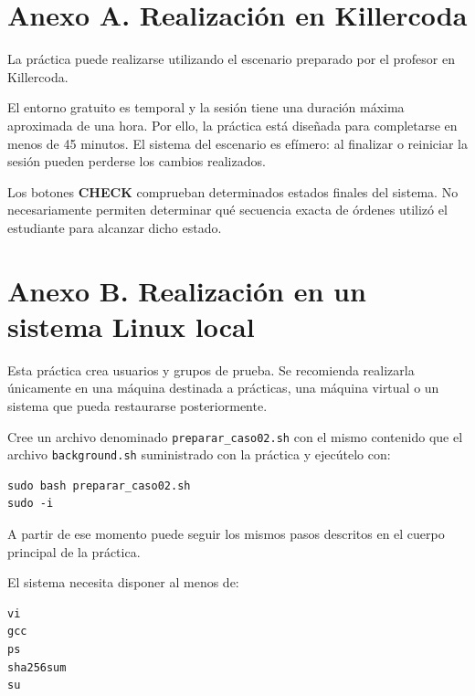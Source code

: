 \appendix

\section*{Anexo A. Realización en Killercoda}

La práctica puede realizarse utilizando el escenario preparado por el profesor en Killercoda.

El entorno gratuito es temporal y la sesión tiene una duración máxima aproximada de una hora. Por ello, la práctica está diseñada para completarse en menos de 45 minutos. El sistema del escenario es efímero: al finalizar o reiniciar la sesión pueden perderse los cambios realizados.

Los botones \textbf{CHECK} comprueban determinados estados finales del sistema. No necesariamente permiten determinar qué secuencia exacta de órdenes utilizó el estudiante para alcanzar dicho estado.

\section*{Anexo B. Realización en un sistema Linux local}

Esta práctica crea usuarios y grupos de prueba. Se recomienda realizarla únicamente en una máquina destinada a prácticas, una máquina virtual o un sistema que pueda restaurarse posteriormente.

Cree un archivo denominado \texttt{preparar\_caso02.sh} con el mismo contenido que el archivo \texttt{background.sh} suministrado con la práctica y ejecútelo con:
\begin{verbatim}
sudo bash preparar_caso02.sh
sudo -i
\end{verbatim}

A partir de ese momento puede seguir los mismos pasos descritos en el cuerpo principal de la práctica.

El sistema necesita disponer al menos de:
\begin{verbatim}
vi
gcc
ps
sha256sum
su
\end{verbatim}
